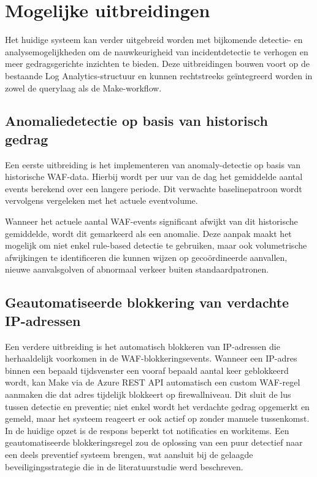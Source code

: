 
\section{Mogelijke uitbreidingen}
Het huidige systeem kan verder uitgebreid worden met bijkomende detectie- en analysemogelijkheden om de nauwkeurigheid van incidentdetectie te verhogen en meer gedragsgerichte inzichten te bieden. Deze uitbreidingen bouwen voort op de bestaande Log Analytics-structuur en kunnen rechtstreeks geïntegreerd worden in zowel de querylaag als de Make-workflow.

\subsection{Anomaliedetectie op basis van historisch gedrag}
Een eerste uitbreiding is het implementeren van anomaly-detectie op basis van historische WAF-data. Hierbij wordt per uur van de dag het gemiddelde aantal events berekend over een langere periode. Dit verwachte baselinepatroon wordt vervolgens vergeleken met het actuele eventvolume.

Wanneer het actuele aantal WAF-events significant afwijkt van dit historische gemiddelde, wordt dit gemarkeerd als een anomalie. Deze aanpak maakt het mogelijk om niet enkel rule-based detectie te gebruiken, maar ook volumetrische afwijkingen te identificeren die kunnen wijzen op gecoördineerde aanvallen, nieuwe aanvalsgolven of abnormaal verkeer buiten standaardpatronen.

\subsection{Geautomatiseerde blokkering van verdachte IP-adressen}
Een verdere uitbreiding is het automatisch blokkeren van IP-adressen die herhaaldelijk voorkomen in de WAF-blokkeringsevents. Wanneer een IP-adres binnen een bepaald tijdsvenster een vooraf bepaald aantal keer geblokkeerd wordt, kan Make via de Azure REST API automatisch een custom WAF-regel aanmaken die dat adres tijdelijk blokkeert op firewallniveau. Dit sluit de lus tussen detectie en preventie; niet enkel wordt het verdachte gedrag opgemerkt en gemeld, maar het systeem reageert er ook actief op zonder manuele tussenkomst. In de huidige opzet is de respons beperkt tot notificaties en workitems. Een geautomatiseerde blokkeringsregel zou de oplossing van een puur detectief naar een deels preventief systeem brengen, wat aansluit bij de gelaagde beveiligingsstrategie die in de literatuurstudie werd beschreven.

